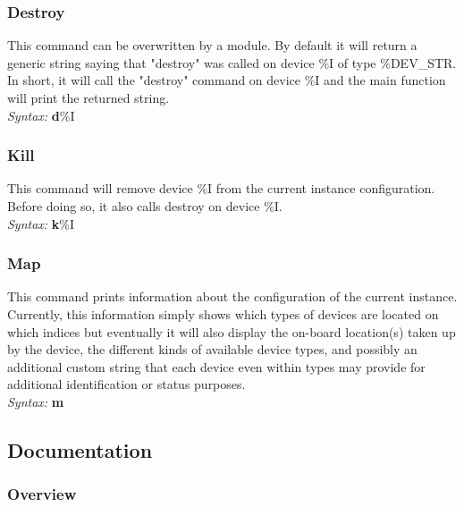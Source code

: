 \documentclass{article}
\begin{document}
\subsubsection{Destroy}

This command can be overwritten by a module. By default it will return a generic string saying that "destroy" was called on device \%I of type \%DEV\_STR. In short, it will call the "destroy" command on device \%I and the main function will print the returned string.
\\
\textit{Syntax: }\textbf{d}\%I

\subsubsection{Kill}

This command will remove device \%I from the current instance configuration. Before doing so, it also calls destroy on device \%I.
\\
\textit{Syntax: }\textbf{k}\%I

\subsubsection{Map}

This command prints information about the configuration of the current instance. Currently, this information simply shows which types of devices are located on which indices but eventually it will also display the on-board location(s) taken up by the device, the different kinds of available device types, and possibly an additional custom string that each device even within types may provide for additional identification or status purposes.
\\
\textit{Syntax: }\textbf{m}

\subsection{Documentation}
\label{subsec:sensor_node_docs}

\subsubsection{Overview}
\label{subsubsec:sensor_node_overview}
\end{document}
